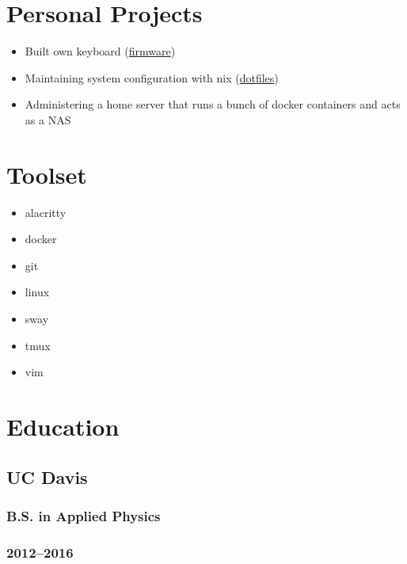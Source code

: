 \documentclass{article}
\begin{document}
\begin{minipage}[t]{.3\textwidth}
	\section*{Personal Projects}
	\begin{itemize}
		\item Built own keyboard
		      (\href{https://github.com/alejandro-angulo/qmk_firmware/tree/master/keyboards/crkbd/keymaps/alejandro-angulo}{firmware})
		\item Maintaining system configuration with nix
		      (\href{https://github.com/alejandro-angulo/dotfiles/tree/nix-config}{dotfiles})
		\item Administering a home server that runs a bunch of docker containers and acts as
		      a NAS
	\end{itemize}
	\section*{Toolset}
	\begin{itemize}
		\item alacritty
		\item docker
		\item git
		\item linux
		\item sway
		\item tmux
		\item vim
	\end{itemize}
	\section*{Education}
	\subsection*{UC Davis}
	\subsubsection*{B.S. in Applied Physics}
	\subsubsection*{2012--2016}
\end{minipage}
\end{document}
